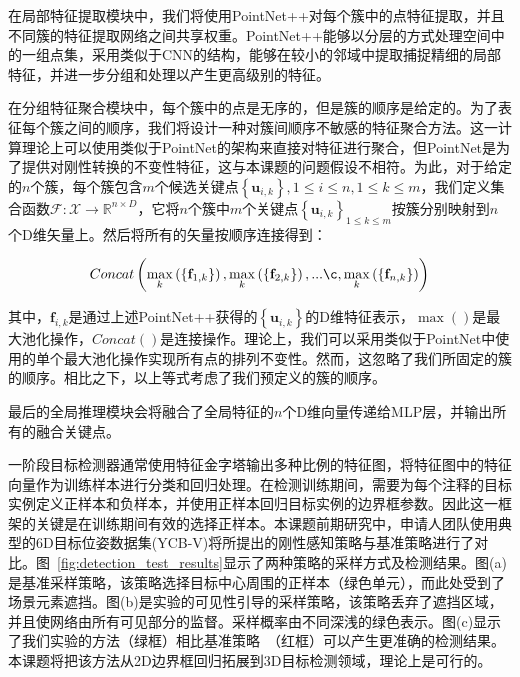 \documentclass[12pt]{article}
\begin{document}
在局部特征提取模块中，我们将使用PointNet++对每个簇中的点特征提取，并且不同簇的特征提取网络之间共享权重。PointNet++能够以分层的方式处理空间中的一组点集，采用类似于CNN的结构，能够在较小的邻域中提取捕捉精细的局部特征，并进一步分组和处理以产生更高级别的特征。

在分组特征聚合模块中，每个簇中的点是无序的，但是簇的顺序是给定的。为了表征每个簇之间的顺序，我们将设计一种对簇间顺序不敏感的特征聚合方法。这一计算理论上可以使用类似于PointNet的架构来直接对特征进行聚合，但PointNet是为了提供对刚性转换的不变性特征，这与本课题的问题假设不相符。为此，对于给定的$n$个簇，每个簇包含$m$个候选关键点$\left\{\mathbf{u}_{i,k}\right\}, 1 \leq i \leq n, 1 \leq k \leq m$，我们定义集合函数$\mathcal{F}: \mathcal{X} \rightarrow \mathbb{R}^{n × D}$，它将$n$个簇中$m$个关键点$\left\{\mathbf{u}_{i,k}\right\}_{1 \leq k \leq m}$按簇分别映射到$n$个D维矢量上。然后将所有的矢量按顺序连接得到：

\begin{equation}
Concat\left(\underset{k}{\max}\left(\left\{\mathbf{f}_{1,k}\right\}\right), \underset{k}{\max}\left(\left\{\mathbf{f}_{2,k}\right\}\right), ...\c, \underset{k}{\max}\left(\left\{\mathbf{f}_{n,k}\right\}\right)\right)
\end{equation}

其中，$\mathbf{f}_{i,k}$是通过上述PointNet++获得的$\left\{\mathbf{u}_{i,k}\right\}$的D维特征表示，$\max()$是最大池化操作，$Concat()$是连接操作。理论上，我们可以采用类似于PointNet中使用的单个最大池化操作实现所有点的排列不变性。然而，这忽略了我们所固定的簇的顺序。相比之下，以上等式考虑了我们预定义的簇的顺序。

最后的全局推理模块会将融合了全局特征的$n$个D维向量传递给MLP层，并输出所有的融合关键点。

一阶段目标检测器通常使用特征金字塔输出多种比例的特征图，将特征图中的特征向量作为训练样本进行分类和回归处理。在检测训练期间，需要为每个注释的目标实例定义正样本和负样本，并使用正样本回归目标实例的边界框参数。因此这一框架的关键是在训练期间有效的选择正样本。本课题前期研究中，申请人团队使用典型的6D目标位姿数据集(YCB-V)将所提出的刚性感知策略与基准策略进行了对比。图~\ref{fig:detection_test_results}显示了两种策略的采样方式及检测结果。图(a)是基准采样策略，该策略选择目标中心周围的正样本（绿色单元），而此处受到了场景元素遮挡。图(b)是实验的可见性引导的采样策略，该策略丢弃了遮挡区域，并且使网络由所有可见部分的监督。采样概率由不同深浅的绿色表示。图(c)显示了我们实验的方法（绿框）相比基准策略~\cite{Zhang2020}（红框）可以产生更准确的检测结果。本课题将把该方法从2D边界框回归拓展到3D目标检测领域，理论上是可行的。
\end{document}
